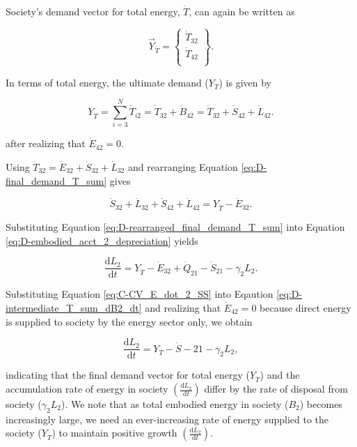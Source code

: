 Society's demand vector for total energy, $\dot{T}$, can again be written as 

\begin{equation} \label{eq:D-demand_vector_T_dot}
	\vec{Y}_{\dot{T}} = 	\begin{Bmatrix} 	\dot{T}_{32}	\\
																\dot{T}_{42}	\\
									\end{Bmatrix}.
\end{equation}

\noindent In terms of total energy, the ultimate demand ($Y_{\dot{T}}$) is given by 

\begin{equation} \label{eq:D-final_demand_T_sum}
	Y_{\dot{T}} = 	\sum_{i=3}^{N} \dot{T}_{i2} = \dot{T}_{32} + \dot{B}_{42} = \dot{T}_{32} + \dot{S}_{42} + \dot{L}_{42}.
\end{equation}

\noindent after realizing that $\dot{E}_{42} = 0$.

Using $\dot{T}_{32} = \dot{E}_{32} + \dot{S}_{32} + \dot{L}_{32}$ and rearranging Equation \ref{eq:D-final_demand_T_sum} gives

\begin{equation} \label{eq:D-rearranged_final_demand_T_sum}
	\dot{S}_{32} +\dot{L}_{32} + \dot{S}_{42} + \dot{L}_{42} = Y_{\dot{T}} - \dot{E}_{32}.
\end{equation}

\noindent Substituting Equation \ref{eq:D-rearranged_final_demand_T_sum} into Equation \ref{eq:D-embodied_acct_2_depreciation} yields

\begin{equation} \label{eq:D-intermediate_T_sum_dB2_dt}
	\frac{\mathrm{d}L_2}{\mathrm{d}t} = Y_{\dot{T}} - \dot{E}_{32} + \dot{Q}_{21} - \dot{S}_{21} - \gamma_2 L_2.
\end{equation}

Substituting Equation \ref{eq:C-CV_E_dot_2_SS} into Eqaution \ref{eq:D-intermediate_T_sum_dB2_dt} and realizing that $\dot{E}_{42} = 0$ because direct energy is supplied to society by the energy sector only, we obtain 

\begin{equation} \label{eq:D-compare_demand_and_accumulation}
	\frac{\mathrm{d}L_{2}}{\mathrm{d}t} = Y_{\dot{T}} - \dot{S}-{21} - \gamma_{2}L_{2},
\end{equation}

\noindent indicating that the final demand vector for total energy ($Y_{\dot{T}}$) and the accumulation rate of energy in society $\left(\frac{\mathrm{d}L_{2}}{\mathrm{d}t}\right)$ differ by the rate of disposal from society ($\gamma_{2}L_{2}$). We note that as total embodied energy in society ($B_{2}$) becomes increasingly large, we need an ever-increasing rate of energy supplied to the society ($Y_{\dot{T}}$) to maintain positive growth $\left(\frac{\mathrm{d}L_{2}}{\mathrm{d}t}\right)$. 

